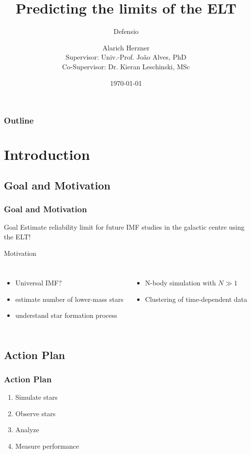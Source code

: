 \documentclass{beamer}
\title{Predicting the limits of the ELT}
\subtitle{Defensio}
\author[Alarich Herzner]{Alarich Herzner\\[1ex]  {\small Supervisor: Univ.-Prof. Jo\~ao Alves, PhD \\ Co-Supervisor: Dr. Kieran Leschinski, MSc}}
\institute{University of Vienna, Faculty of Physics}
\date{\today}
\begin{document}
\begin{frame}
\titlepage
\end{frame}

\begin{frame}
\frametitle{Outline}
\tableofcontents
\end{frame}

\section{Introduction}
\subsection{Goal and Motivation}

\begin{frame}
\frametitle{Goal and Motivation}
\begin{block}{Goal}
Estimate reliability limit for future IMF studies in the galactic centre using the ELT!
\end{block}

\begin{block}{Motivation}
	\begin{columns}[T]
	\vspace{0.5em}
	\begin{itemize}
	\item Universal IMF?
	\item estimate number of lower-mass stars
	\item understand star formation process
	\end{itemize}
	\vspace{0.5em}
	\begin{itemize}
	\item N-body simulation with \(N \gg 1\)
	\item Clustering of time-dependent data
	\end{itemize}
	\end{columns}
\end{block}

\end{frame}


\subsection{Action Plan}

\begin{frame}
\frametitle{Action Plan}
\begin{enumerate}[I]
\item Simulate stars
\item Observe stars
\item Analyze
\item Measure performance
\end{enumerate}
\end{frame}
\end{document}
